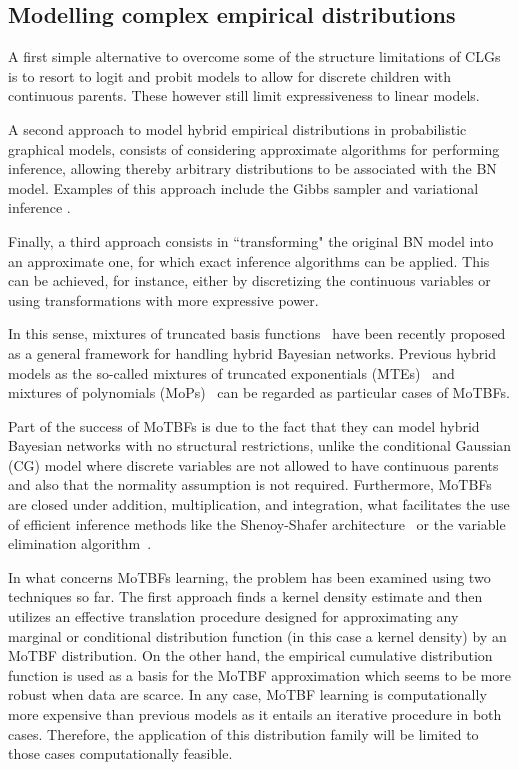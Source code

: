 \subsection{Modelling complex empirical distributions}


  

A first simple alternative to overcome some of the structure limitations of CLGs is to resort to logit and probit models to allow for discrete children with continuous parents. These however still limit expressiveness to linear models.

A second approach to model hybrid empirical distributions in probabilistic graphical models, consists of considering approximate algorithms for performing inference, allowing thereby arbitrary distributions to be associated with the BN model. Examples of this approach include the Gibbs sampler \cite{Geman1984, hrycej1990gibbs} and variational inference \cite{Jordan1999}. 

Finally, a third approach consists in ``transforming" the original BN model into an approximate one, for which exact inference algorithms can be applied. This can be achieved, for instance, either by discretizing the continuous variables \cite{KozlovKollerUAI97} or using transformations with more expressive power.

In this sense, mixtures of truncated basis functions~\cite{Langseth12} have been recently proposed as a general framework for handling hybrid Bayesian networks. Previous hybrid models as the so-called mixtures of truncated exponentials (MTEs)~\cite{Moral2001} and mixtures of polynomials (MoPs)~\cite{Shenoy2011} can be regarded as particular cases of MoTBFs. 

Part of the success of MoTBFs is due to the fact that they can model hybrid Bayesian networks with no structural restrictions, unlike the conditional Gaussian (CG) model where discrete variables are not allowed to have continuous parents and also that the normality assumption is not required. Furthermore, MoTBFs are closed under addition, multiplication, and integration, what facilitates the use of efficient inference methods like the Shenoy-Shafer architecture~\cite{She90} or the variable elimination algorithm~\cite{Zha96}. 

In what concerns MoTBFs learning, the problem has been examined using two techniques so far. The first approach finds a kernel density estimate and then utilizes an effective translation procedure designed for approximating any marginal or conditional distribution function (in this case a kernel density) by an MoTBF distribution. On the other hand, the empirical cumulative distribution function is used as a basis for the MoTBF approximation which seems to be more robust when data are scarce. In any case, MoTBF learning is computationally more expensive than previous models as it entails an iterative procedure in both cases. Therefore, the application of this distribution family will be limited to those cases computationally feasible.

